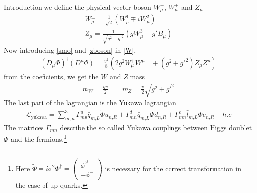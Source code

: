 \begin{chapter}{Introduction}
we define the physical vector boson $W^-_\mu$, $W^+_\mu$ and $Z_\mu$ 
\begin{align} 
W^{\pm}_\mu=\frac{1}{\sqrt{2}} (W^1_\mu \mp iW^2_\mu) \label{smo}\\ 
Z_\mu=\frac{1}{\sqrt{g^2+g'^2}}\left(gW^3_\mu -g'B_\mu  \right) \label{zboson}
\end{align}
 Now introducing \ref{smo} and \ref{zboson} in \ref{W},
\begin{align}
(D_\mu \Phi)^\dagger (D^\mu \Phi)=\frac{v^2}{8}\left(2g^2 W_\mu^+ W^{\mu-} + (g^2+g'^2)Z_\mu Z^\mu \right) 
\end{align}
from the coeficients, we get the $W$ and $Z$ mass 
\begin{align}
m_W=\frac{gv}{2} \qquad m_Z=\frac{v}{2}\sqrt{g^2+g'^2}
\end{align}
The last part of the lagrangian is the Yukawa lagrangian
\begin{align}
\mathcal{L}_\text{yukawa}=\sum_{m,n}^{3}  \Gamma^u_{mn}\bar{q}_{m\text{,}L} \tilde{\Phi} u_{n\text{,}R}+\Gamma^d_{mn}\bar{q}_{m\text{,}L} \Phi d_{n\text{,}R}+\Gamma^e_{mn}\bar{l}_{m\text{,}L} \Phi e_{n\text{,}R}+h.c
\end{align}
The matrices $\Gamma_{mn}$ describe the so called Yukawa couplings between Higgs doublet $\Phi$ and the fermions.\footnote{Here $
	\tilde{\Phi}=i\sigma^2 \Phi^\dagger =\left(\begin{array}{c}
	\phi^{0^\dagger} \\
	-\phi^-
	\end{array} \right)
	$ is necessary for the correct transformation in the case of up quarks. 
}
\end{chapter}
